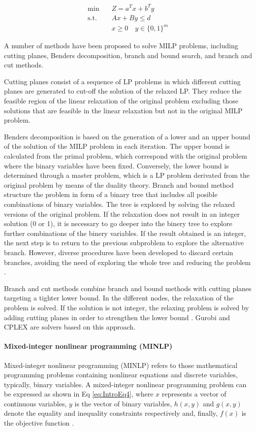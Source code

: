 \begin{refsection}[referencesCh1]
\begin{align}
		\min \quad & Z=a^{T}x + b^{T}y \nonumber\\
		\textrm{s.t.} \quad & Ax+By \leq d \label{eq:IntroEq3}\\
		& x \geq 0 \quad y \in \lbrace 0,1 \rbrace ^{m} \nonumber
\end{align}  

A number of methods have been proposed to solve MILP problems, including cutting planes, Benders decomposition, branch and bound search, and branch and cut methods.

Cutting planes consist of a sequence of LP problems in which different cutting planes are generated to cut-off the solution of the relaxed LP. They reduce the feasible region of the linear relaxation of the original problem excluding those solutions that are feasible in the linear relaxation but not in the original MILP problem. 

Benders decomposition is based on the generation of a lower and an upper bound of the solution of the MILP problem in each iteration. The upper bound is calculated from the primal problem, which correspond with the original problem where the binary variables have been fixed. Conversely, the lower bound is determined through a master problem, which is a LP problem derivated from the original problem by means of the duality theory. Branch and bound method structure the problem in form of a binary tree that includes all posible combinations of binary variables. The tree is explored by solving the relaxed versions of the original problem.  If the relaxation does not result in an integer solution (0 or 1), it is necessary to go deeper into the binery tree to explore further combinations of the binery variables. If the result obtained is an integer, the next step is to return to the previous subproblem to explore the alternative branch. However, diverse procedures have been developed to discard certain branches, avoiding the need of exploring the whole tree and reducing the problem \citep{floudas1995nonlinear}.

Branch and cut methods combine branch and bound methods with cutting planes targeting a tighter lower bound. In the different nodes, the relaxation of the problem is solved. If the solution is not integer, the relaxing problem is solved by adding cutting planes in order to strengthen the lower bound \citep{grossmann2021advanced}. Gurobi and CPLEX are solvers based on this approach.

\paragraph{Mixed-integer nonlinear programming (MINLP)}
Mixed-integer nonlinear programming (MINLP) refers to those mathematical programming problems containing nonlinear equations and discrete variables, typically, binary variables. A mixed-integer nonlinear programming problem can be expressed as shown in Eq \ref{eq:IntroEq4}, where $x$ represents a vector of continuous variables, $y$ is the vector of binary variables, $h(x,y)$ and $g(x,y)$ denote the equality and inequality constraints respectively and, finally, $f(x)$ is the objective function \citep{grossmann2021advanced}.


\end{refsection}
